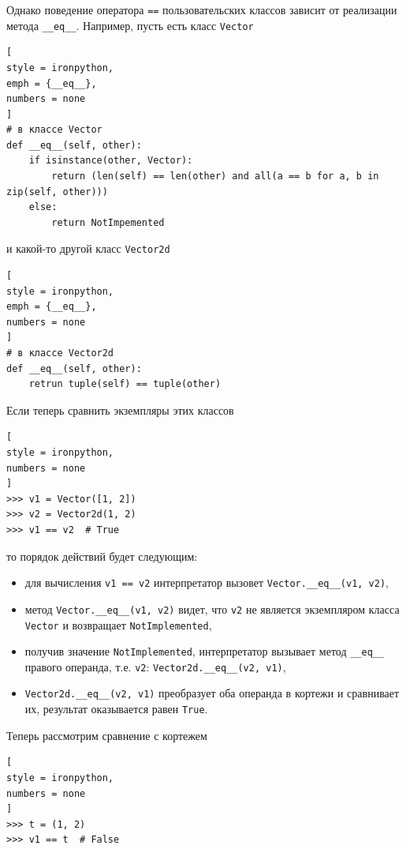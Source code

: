 \documentclass[%
	11pt,
	a4paper,
	utf8,
		]{article}
\begin{document}
Однако поведение оператора \texttt{==} пользовательских классов зависит от реализации метода \texttt{\_\_eq\_\_}. Например, пусть есть класс \texttt{Vector}

\begin{lstlisting}[
style = ironpython,
emph = {__eq__},
numbers = none
]
# в классе Vector
def __eq__(self, other):
    if isinstance(other, Vector):
        return (len(self) == len(other) and all(a == b for a, b in zip(self, other)))
    else:
        return NotImpemented
\end{lstlisting}

и какой-то другой класс \texttt{Vector2d}

\begin{lstlisting}[
style = ironpython,
emph = {__eq__},
numbers = none
]
# в классе Vector2d
def __eq__(self, other):
    retrun tuple(self) == tuple(other)
\end{lstlisting}

Если теперь сравнить экземпляры этих классов

\begin{lstlisting}[
style = ironpython,
numbers = none
]
>>> v1 = Vector([1, 2])
>>> v2 = Vector2d(1, 2)
>>> v1 == v2  # True
\end{lstlisting}
то порядок действий будет следующим:

\begin{itemize}
	\item для вычисления \texttt{v1 == v2} интерпретатор вызовет \texttt{Vector.\_\_eq\_\_(v1, v2)},
	
	\item метод \texttt{Vector.\_\_eq\_\_(v1, v2)} видет, что \texttt{v2} не является экземпляром класса \texttt{Vector} и возвращает \texttt{NotImplemented},
	
	\item получив значение \texttt{NotImplemented}, интерпретатор вызывает метод \texttt{\_\_eq\_\_} правого операнда, т.е. \texttt{v2}: \texttt{Vector2d.\_\_eq\_\_(v2, v1)},
	
	\item \texttt{Vector2d.\_\_eq\_\_(v2, v1)} преобразует оба операнда в кортежи и сравнивает их, результат оказывается равен \texttt{True}.
\end{itemize}

Теперь рассмотрим сравнение с кортежем

\begin{lstlisting}[
style = ironpython,
numbers = none
]
>>> t = (1, 2)
>>> v1 == t  # False
\end{lstlisting}
\end{document}
